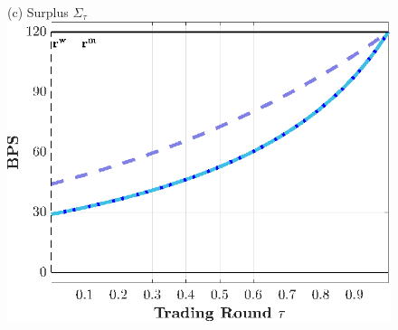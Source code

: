 \documentclass[12pt,american,english,notitlepage]{article}
\begin{document}
\begin{figure}[H]
\begin{centering}
\endminipage\hfill
{}
\centering (c) Surplus $\Sigma_{\tau}$ \\[2pt]
\includegraphics[width=0.8\linewidth]{NewCode/Figures/F_cd_Surplus_tau.eps}
\endminipage
\par\end{centering}

\vspace{10pt}


\end{figure}
\end{document}
